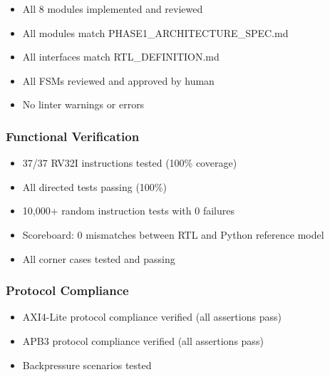 \begin{record}

\begin{itemize}
\tightlist
\item
  \ok{} All 8 modules implemented and reviewed
\item
  \ok{} All modules match
  PHASE1\_\allowbreak{}ARCHITECTURE\_\allowbreak{}SPEC.md
\item
  \ok{} All interfaces match RTL\_\allowbreak{}DEFINITION.md
\item
  \ok{} All FSMs reviewed and approved by human
\item
  \ok{} No linter warnings or errors
\end{itemize}

\end{record}

\subsubsection{Functional Verification}\label{cr:status:phase1-ai-human-responsibilities:functional-verification}

\begin{record}

\begin{itemize}
\tightlist
\item
  \ok{} 37/37 RV32I instructions tested (100\% coverage)
\item
  \ok{} All directed tests passing (100\%)
\item
  \ok{} 10,000+ random instruction tests with 0 failures
\item
  \ok{} Scoreboard: 0 mismatches between RTL and Python reference model
\item
  \ok{} All corner cases tested and passing
\end{itemize}

\end{record}

\subsubsection{Protocol Compliance}\label{cr:status:phase1-ai-human-responsibilities:protocol-compliance}

\begin{record}

\begin{itemize}
\tightlist
\item
  \ok{} AXI4-Lite protocol compliance verified (all assertions pass)
\item
  \ok{} APB3 protocol compliance verified (all assertions pass)
\item
  \ok{} Backpressure scenarios tested
\end{itemize}

\end{record}

